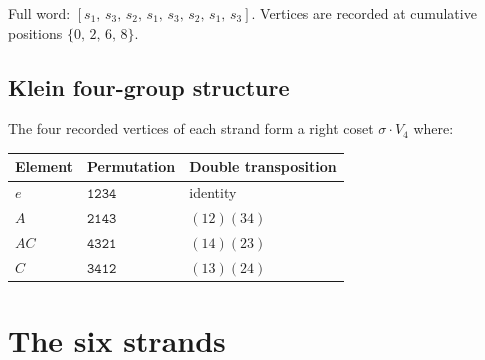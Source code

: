 \documentclass[11pt]{article}
\newcommand{\perm}[1]{\mathtt{#1}}
\begin{document}
Full word: $[s_1,\, s_3,\, s_2,\, s_1,\, s_3,\, s_2,\, s_1,\, s_3]$.
Vertices are recorded at cumulative positions $\{0,\, 2,\, 6,\, 8\}$.

\subsection{Klein four-group structure}

The four recorded vertices of each strand form a right coset
$\sigma \cdot V_4$ where:

\begin{center}
\begin{tabular}{@{}lll@{}}
\toprule
Element & Permutation & Double transposition \\
\midrule
$e$  & $\perm{1234}$ & identity \\
$A$  & $\perm{2143}$ & $(12)(34)$ \\
$AC$ & $\perm{4321}$ & $(14)(23)$ \\
$C$  & $\perm{3412}$ & $(13)(24)$ \\
\bottomrule
\end{tabular}
\end{center}

\section{The six strands}
\end{document}
